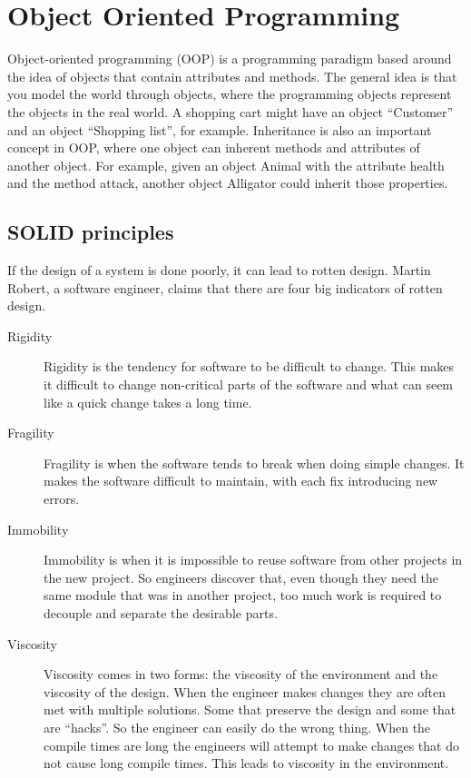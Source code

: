 \section{Object Oriented Programming}\label{oop}

Object-oriented programming (OOP) is a programming paradigm based around the
idea of objects that contain attributes and methods. The general idea is that
you model the world through objects, where the programming objects represent the
objects in the real world. A shopping cart might have an object ``Customer'' and
an object ``Shopping list'', for example. Inheritance is also an important
concept in OOP, where one object can inherent methods and attributes of another
object.  For example, given an object Animal with the attribute health and the
method attack, another object Alligator could inherit those
properties.~\cite{Gamma:1995:DPE:186897}

\subsection{SOLID principles}

If the design of a system is done poorly, it can lead to rotten design. Martin
Robert, a software engineer, claims that there are four big indicators of rotten
design.
\begin{description}

\item[ Rigidity ] Rigidity is the tendency for software to be difficult to
change. This makes it difficult to change non-critical parts of the software and
what can seem like a quick change takes a long time.

\item[ Fragility ] Fragility is when the software tends to break when doing
simple changes. It makes the software difficult to maintain, with each fix
introducing new errors.

\item[ Immobility ] Immobility is when it is impossible to reuse software from
other projects in the new project. So engineers discover that, even though they
need the same module that was in another project, too much work is required to
decouple and separate the desirable parts.

\item[ Viscosity ] 

Viscosity comes in two forms: the viscosity of the environment and the viscosity
of the design. When the engineer makes changes they are often met with multiple
solutions. Some that preserve the design and some that are ``hacks''. So the
engineer can easily do the wrong thing. When the compile times are long the
engineers will attempt to make changes that do not cause long compile times.
This leads to viscosity in the environment.
\end{description}


